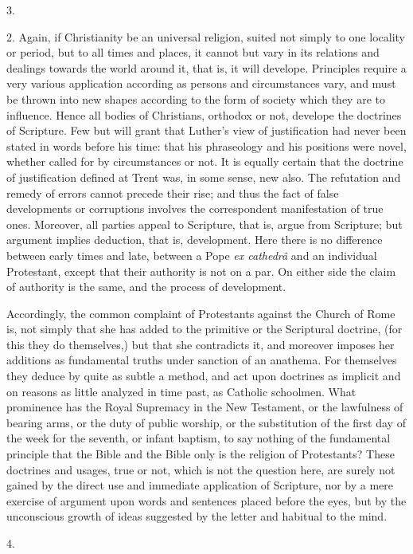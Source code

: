 3.

2. Again, if Christianity be an universal religion,
suited not simply to one locality or period, but to all
times and places, it cannot but vary in its relations and
dealings towards the world around it, that is, it will
develope. Principles require a very various application
according as persons and circumstances vary, and must be
thrown into new shapes according to the form of society
which they are to influence. Hence all bodies of
Christians, orthodox or not, develope the doctrines of
Scripture. Few but will grant that Luther's view of
justification had never been stated in words before his
time: that his phraseology and his positions were novel,
whether called for by circumstances or not. It is equally
certain that the doctrine of justification defined at
Trent was, in some sense, new also. The refutation and
remedy of errors cannot precede their rise; and thus the
fact of false developments or corruptions involves the
correspondent manifestation of true ones. Moreover, all
parties appeal to Scripture, that is, argue from
Scripture; but argument implies deduction, that is,
development. Here there is no difference between early
times and late, between a Pope \emph{ex cathedrâ} and an
individual Protestant, except that their authority is not
on a par. On either side the claim of authority is the
same, and the process of development.

Accordingly, the common complaint of Protestants
against the Church of Rome is, not simply that she has
added to the primitive or the Scriptural doctrine, (for
this they do themselves,) but that she contradicts it,
and moreover imposes her additions as fundamental truths
under sanction of an anathema. For themselves they deduce
by quite as subtle a method, and act upon doctrines as
implicit and on reasons as little analyzed in time past,
as Catholic schoolmen. What prominence has the Royal
Supremacy in the New Testament, or the lawfulness of
bearing arms, or the duty of public worship, or the
substitution of the first day of the week for the
seventh, or infant baptism, to say nothing of the
fundamental principle that the Bible and the Bible only
is the religion of Protestants? These doctrines and
usages, true or not, which is not the question here, are
surely not gained by the direct use and immediate
application of Scripture, nor by a mere exercise of
argument upon words and sentences placed before the eyes,
but by the unconscious growth of ideas suggested by the
letter and habitual to the mind.

4.


